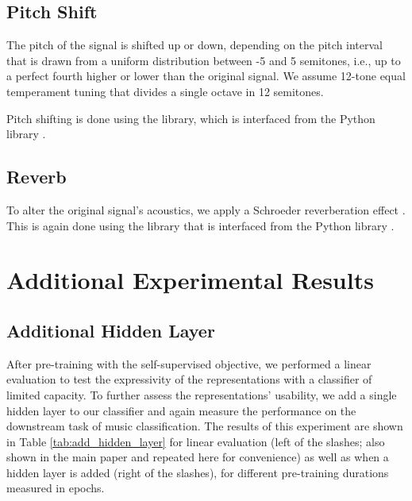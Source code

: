 \documentclass{article}
\begin{document}
\subsection{Pitch Shift}
The pitch of the signal is shifted up or down, depending on the pitch interval that is drawn from a uniform distribution between -5 and 5 semitones, i.e., up to a perfect fourth higher or lower than the original signal. We assume 12-tone equal temperament tuning that divides a single octave in 12 semitones.


Pitch shifting is done using the  library, which is interfaced from the  Python library \cite{wavaugment2020}.

\subsection{Reverb}
To alter the original signal's acoustics, we apply a Schroeder reverberation effect \cite{schroeder1962natural}. This is again done using the  library that is interfaced from the  Python library \cite{wavaugment2020}.



\section{Additional Experimental Results}
\label{appendix:additional_results}


\subsection{Additional Hidden Layer}
After pre-training with the self-supervised objective, we performed a linear evaluation to test the expressivity of the representations with a classifier of limited capacity. To further assess the representations' usability, we add a single hidden layer to our classifier and again measure the performance on the downstream task of music classification. The results of this experiment are shown in Table \ref{tab:add_hidden_layer} for linear evaluation (left of the slashes; also shown in the main paper and repeated here for convenience) as well as when a hidden layer is added (right of the slashes), for different pre-training durations measured in epochs.
\end{document}
